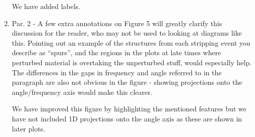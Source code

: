 \documentclass{article}
\begin{document}
\begin{enumerate}
{\color{red} We have added labels.}

\item Par. 2 - A few extra annotations on Figure 5 will greatly clarify this discussion for the
reader, who may not be used to looking at diagrams like this. Pointing out an example
of the structures from each stripping event you describe as “spurs”, and the regions in
the plots at late times where perturbed material is overtaking the unperturbed stuff,
would especially help. The differences in the gaps in frequency and angle referred to in
the paragraph are also not obvious in the figure - showing projections onto the
angle/frequency axis would make this clearer.

{\color{red} We have improved this figure by highlighting the mentioned features but we have not included 1D projections onto the angle axis as these are shown in later plots.}

\end{enumerate}
\end{document}
